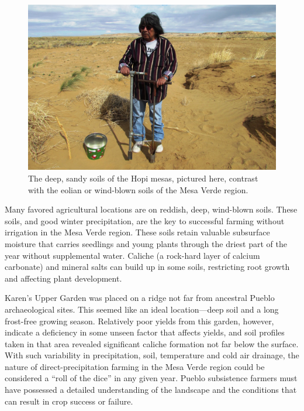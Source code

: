 \documentclass[12pt,]{article}
\begin{document}
\begin{figure}
\centering
\includegraphics{./images/chapter_6_mv_versus_hopi.jpg}
\caption{The deep, sandy soils of the Hopi mesas, pictured here, contrast with the eolian or wind-blown soils of the Mesa Verde region.}
\end{figure}

Many favored agricultural locations are on reddish, deep, wind-blown soils. These soils, and good winter precipitation, are the key to successful farming without irrigation in the Mesa Verde region. These soils retain valuable subsurface moisture that carries seedlings and young plants through the driest part of the year without supplemental water. Caliche (a rock-hard layer of calcium carbonate) and mineral salts can build up in some soils, restricting root growth and affecting plant development.

Karen's Upper Garden was placed on a ridge not far from ancestral Pueblo archaeological sites. This seemed like an ideal location---deep soil and a long frost-free growing season. Relatively poor yields from this garden, however, indicate a deficiency in some unseen factor that affects yields, and soil profiles taken in that area revealed significant caliche formation not far below the surface. With such variability in precipitation, soil, temperature and cold air drainage, the nature of direct-precipitation farming in the Mesa Verde region could be considered a ``roll of the dice'' in any given year. Pueblo subsistence farmers must have possessed a detailed understanding of the landscape and the conditions that can result in crop success or failure.
\end{document}
